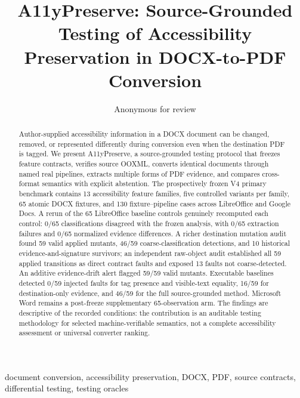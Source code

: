 \documentclass[conference]{IEEEtran}
\title{A11yPreserve: Source-Grounded Testing of Accessibility Preservation in DOCX-to-PDF Conversion}
\author{Anonymous for review}
\begin{document}
\maketitle

\begin{abstract}
Author-supplied accessibility information in a DOCX document can be changed, removed, or represented differently during conversion even when the destination PDF is tagged. We present A11yPreserve, a source-grounded testing protocol that freezes feature contracts, verifies source OOXML, converts identical documents through named real pipelines, extracts multiple forms of PDF evidence, and compares cross-format semantics with explicit abstention. The prospectively frozen V4 primary benchmark contains 13 accessibility feature families, five controlled variants per family, 65 atomic DOCX fixtures, and 130 fixture--pipeline cases across LibreOffice and Google Docs. A rerun of the 65 LibreOffice baseline controls genuinely recomputed each control: 0/65 classifications disagreed with the frozen analysis, with 0/65 extraction failures and 0/65 normalized evidence differences. A richer destination mutation audit found 59 valid applied mutants, 46/59 coarse-classification detections, and 10 historical evidence-and-signature survivors; an independent raw-object audit established all 59 applied transitions as direct contract faults and exposed 13 faults not coarse-detected. An additive evidence-drift alert flagged 59/59 valid mutants. Executable baselines detected 0/59 injected faults for tag presence and visible-text equality, 16/59 for destination-only evidence, and 46/59 for the full source-grounded method. Microsoft Word remains a post-freeze supplementary 65-observation arm. The findings are descriptive of the recorded conditions: the contribution is an auditable testing methodology for selected machine-verifiable semantics, not a complete accessibility assessment or universal converter ranking.
\end{abstract}

\begin{IEEEkeywords}
document conversion, accessibility preservation, DOCX, PDF, source contracts, differential testing, testing oracles
\end{IEEEkeywords}










\end{document}
